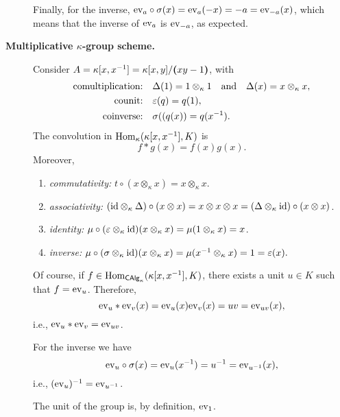 \begin{xmpls}
\begin{description}
        Finally, for the inverse, $\text{\rm ev}_a\circ\sigma(x)=\text{\rm ev}_a(-x)=-a=\text{\rm ev}_{-a}(x)$, which means that the inverse of $\text{\rm ev}_a$ is $\text{\rm ev}_{-a}$, as expected.

        \item[\textbf{Multiplicative $\kappa$-group scheme.}]\label{xmpl:item-k[x,x^-1]} Consider $A=\kappa[x,x^{-1}]=\kappa[x,y]/\textrm{\boldmath$($}xy-1\textrm{\boldmath$)$}$, with
        \begin{align*}
            \text{comultiplication:}\quad
                &\Delta(1)=1\otimes_\kappa1
                \quad{\rm and}\quad
                \Delta(x)=x\otimes_\kappa x,\\
            \text{counit:}\quad
                &\varepsilon(q)=q(1),\\
            \text{coinverse:}\quad
                &\sigma((q(x))=q(x^{-1}).
        \end{align*}
        The convolution in ${\rm Hom}_\kappa(\kappa[x,x^{-1}],K)$ is
        $$
            f*g(x) = f(x)g(x).
        $$
        Moreover,
        \begin{enumerate}[-]
            \item \textit{commutativity:} $t\circ(x\otimes_\kappa x)=x\otimes_\kappa x$.

            \item\textit{associativity:}
                $(\text{\rm id}\otimes_\kappa\Delta)\circ(x\otimes x)
                = x\otimes x\otimes x
                = (\Delta\otimes_\kappa\text{\rm id})\circ(x\otimes x)$.

            \item\textit{identity:}
                $\mu\circ(\varepsilon\otimes_\kappa\text{\rm id})(x\otimes_\kappa x) = \mu(1\otimes_\kappa x)= x$.

            \item\textit{inverse:} $\mu\circ(\sigma\otimes_\kappa\text{\rm id})
                (x\otimes_\kappa x) = \mu(x^{-1}\otimes_\kappa x) = 1 = \varepsilon(x).$
        \end{enumerate}
        Of course, if $f\in{\rm Hom}_{\mathsf{CAlg}_\kappa}(\kappa[x,x^{-1}], K)$, there exists a unit $u\in K$ such that $f=\text{\rm ev}_u$. Therefore,
        $$
            \text{\rm ev}_u*\text{\rm ev}_v(x) = \text{\rm ev}_u(x)\text{\rm ev}_v(x)
                = uv =\text{\rm ev}_{uv}(x),
        $$
        i.e., $\text{\rm ev}_u*\text{\rm ev}_v=\text{\rm ev}_{uv}$.

        For the inverse we have
        $$
            \text{\rm ev}_u\circ\sigma(x)=\text{\rm ev}_u(x^{-1})= u^{-1}=\text{\rm ev}_{u^{-1}}(x),
        $$
        i.e., $(\text{\rm ev}_u)^{-1}=\text{\rm ev}_{u^{-1}}$.

        The unit of the group is, by definition, $\text{\rm ev}_1$.


\end{description}
\end{xmpls}

